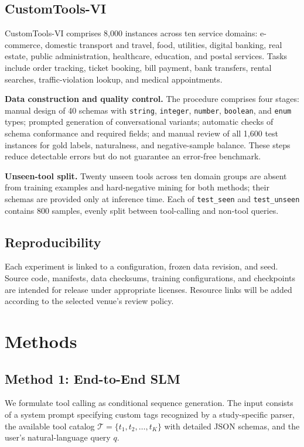 \documentclass[10pt,twocolumn,a4paper]{article}
\begin{document}
\subsection{CustomTools-VI}
CustomTools-VI comprises 8,000 instances across ten service domains: e-commerce, domestic transport and travel, food, utilities, digital banking, real estate, public administration, healthcare, education, and postal services. Tasks include order tracking, ticket booking, bill payment, bank transfers, rental searches, traffic-violation lookup, and medical appointments.

\textbf{Data construction and quality control.} The procedure comprises four stages: manual design of 40 schemas with \texttt{string}, \texttt{integer}, \texttt{number}, \texttt{boolean}, and \texttt{enum} types; prompted generation of conversational variants; automatic checks of schema conformance and required fields; and manual review of all 1,600 test instances for gold labels, naturalness, and negative-sample balance. These steps reduce detectable errors but do not guarantee an error-free benchmark.

\textbf{Unseen-tool split.} Twenty unseen tools across ten domain groups are absent from training examples and hard-negative mining for both methods; their schemas are provided only at inference time. Each of \texttt{test\_seen} and \texttt{test\_unseen} contains 800 samples, evenly split between tool-calling and non-tool queries.

\subsection{Reproducibility}
Each experiment is linked to a configuration, frozen data revision, and seed. Source code, manifests, data checksums, training configurations, and checkpoints are intended for release under appropriate licenses. Resource links will be added according to the selected venue's review policy.

\section{Methods}

\subsection{Method 1: End-to-End SLM}
We formulate tool calling as conditional sequence generation. The input consists of a system prompt specifying custom tags recognized by a study-specific parser, the available tool catalog $\mathcal{T}=\{t_1,t_2,\dots,t_K\}$ with detailed JSON schemas, and the user's natural-language query $q$.
\end{document}
